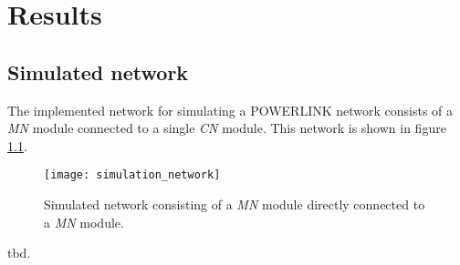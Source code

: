 \chapter{Results}
\label{cha:results}

\section{Simulated network}
\label{sec:results_network}
The implemented network for simulating a POWERLINK network consists of a \emph{MN} module connected to a single \emph{CN} module.
This network is shown in figure \ref{fig:simulation_network}.

\begin{figure}
    \centering
    \texttt{[image: simulation\_network]}
    \caption{Simulated network consisting of a \emph{MN} module directly connected to a \emph{MN} module.}
    \label{fig:simulation_network}
\end{figure}

tbd.